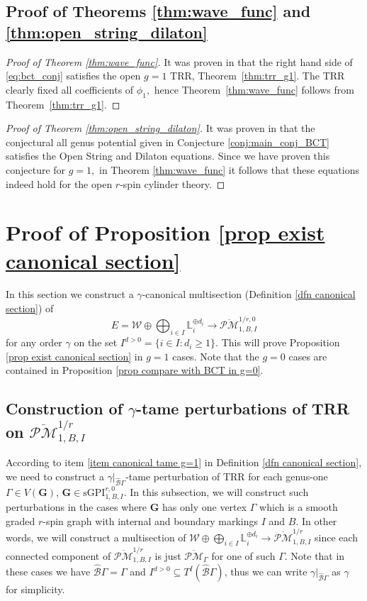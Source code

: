 \documentclass[11pt]{amsart}
\theoremstyle{definition}
\theoremstyle{remark}
\newcommand{\oPMb}{{\overline{\mathcal{PM}}}}
\newcommand{\<}{\left<}
\renewcommand{\>}{\right>}
\numberwithin{equation}{section}
\def\sGPI{\text{sGPI}}
\begin{document}
\subsection{Proof of Theorems \ref{thm:wave_func} and \ref{thm:open_string_dilaton}}
\begin{proof}[Proof of %
Theorem \ref{thm:wave_func}]
It was proven in \cite[\S 3.4]{BCT3} that the right hand side of \eqref{eq:bct_conj} satisfies the open $g=1$ TRR, Theorem~\ref{thm:trr_g1}. The TRR clearly fixed all coefficients of $\phi_1,$ hence Theorem~\ref{thm:wave_func} follows from Theorem~\ref{thm:trr_g1}.
\end{proof}
\begin{proof}[Proof of Theorem \ref{thm:open_string_dilaton}]
It was proven in \cite[\S 3.3]{BCT3} that the conjectural all genus potential given in Conjecture \ref{conj:main_conj_BCT} satisfies the Open String and Dilaton equations. Since we have proven this conjecture for $g=1,$ in Theorem \ref{thm:wave_func} it follows that these equations indeed hold for the open $r$-spin cylinder theory.
\end{proof}








\section{Proof of Proposition \ref{prop exist canonical section}}\label{sec construction of section}
In this section we construct a $\gamma$-canonical multisection (Definition \ref{dfn canonical section}) of
$$E=\mathcal W\oplus \bigoplus_{i\in I} \mathbb L_i^{\oplus d_i}\to \oPMb^{1/r,0}_{1,B,I}$$
for any order $\gamma$ on the set $I^{d>0}=\{i\in I\colon d_i\ge 1\}$. This will prove Proposition \ref{prop exist canonical section} in $g=1$ cases. Note that the $g=0$ cases are contained in Proposition \ref{prop compare with BCT in g=0}.

 

\subsection{Construction of $\gamma$-tame perturbations of TRR on $\oPMb^{1/r}_{1,B,I}$}\label{sec construction tame section}
 According to item \ref{item canonical tame g=1} in Definition \ref{dfn canonical section}, we need to construct a $\gamma\vert_{\hat{\mathcal B}\Gamma}$-tame perturbation of TRR for each genus-one $\Gamma\in V(\bm{G})$, $\bm{G}\in \sGPI_{1,B,I}^{r,0}$. In this subsection, we will construct such perturbations in the cases where $\bm{G}$ has only one vertex $\Gamma$ which is a smooth graded $r$-spin graph with internal and boundary markings $I$ and $B$. In other words, we will construct a multisection of $\mathcal W \oplus \bigoplus_{i\in I} \mathbb L_i^{\oplus d_i}\to \oPMb_{1,B,I}^{1/r}$ since each connected component of $\oPMb_{1,B,I}^{1/r}$ is just $\oPMb_{\Gamma}$ for one of such $\Gamma$.
 Note that in these cases we have $\hat{\mathcal B}\Gamma=\Gamma$ and $I^{d>0}\subseteq T^I(\hat{\mathcal B}\Gamma)$, thus we can write $\gamma\vert_{\hat{\mathcal B}\Gamma}$ as $\gamma$ for simplicity. 
\end{document}

